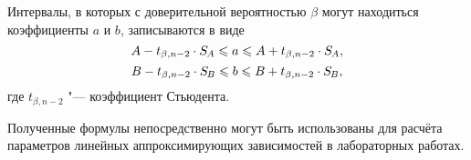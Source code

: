 \documentclass[a4paper, 12pt]{extarticle}
\newcommand{\SA}{S_{\kern-.053em A}}
\newcommand{\SB}{S_{\kern-.058em B}}
\begin{document}
Интервалы, в которых с доверительной вероятностью $\beta$ могут находиться коэффициенты $a$ и $b$, записываются в виде
\begin{equation}
\label{eq:m11-range-1}
A - t_{\beta, n - 2} \cdot \SA \leqslant a \leqslant A + t_{\beta, n - 2} \cdot \SA, %
\end{equation} 
\begin{equation}
\label{eq:m11-range-2}
B - t_{\beta, n - 2} \cdot \SB \leqslant b \leqslant B + t_{\beta, n - 2} \cdot \SB, %
\end{equation}
где $t_{\beta, n-2}$ "--- коэффициент Стьюдента.

Полученные формулы непосредственно могут быть использованы для расчёта параметров линейных аппроксимирующих зависимостей в лабораторных работах.
\end{document}
